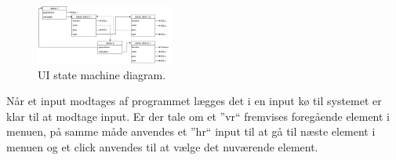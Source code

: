 \begin{figure} 
	\centering 
	\includegraphics[width=4.5cm]{billeder/menuesdiagram.png} 
	\caption{UI state machine diagram. } 
	\label{fig:uistatemachine} 
\end{figure}
Når et input  modtages af programmet lægges det i en input kø til systemet er klar til at modtage input. Er der tale om et ''vr`` fremvises foregående element i menuen, på samme måde anvendes et ''hr`` input til at gå til næste element i menuen og et click anvendes til at vælge det nuværende element.
